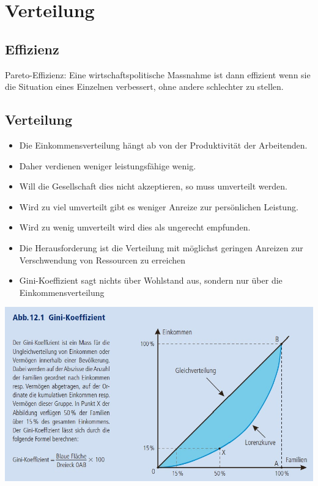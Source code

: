 \section{Verteilung}
\subsection{Effizienz}
Pareto-Effizienz: Eine wirtschaftspolitische Massnahme ist dann effizient wenn sie die Situation eines Einzelnen verbessert, ohne andere schlechter zu stellen. 
\subsection{Verteilung}
\begin{itemize}
	\item Die Einkommensverteilung hängt ab von der Produktivität der Arbeitenden.
	\item Daher verdienen weniger leistungsfähige wenig.
	\item Will die Gesellschaft dies nicht akzeptieren, so muss umverteilt werden.
	\item Wird zu viel umverteilt gibt es weniger Anreize zur persönlichen Leistung.
	\item Wird zu wenig umverteilt wird dies als ungerecht empfunden.
	\item Die Herausforderung ist die Verteilung mit möglichst geringen Anreizen zur Verschwendung von Ressourcen zu erreichen
	\item Gini-Koeffizient sagt nichts über Wohlstand aus, sondern nur über die Einkommensverteilung
\end{itemize}
\includegraphics[width=0.7\linewidth]{images/gini.jpg}
